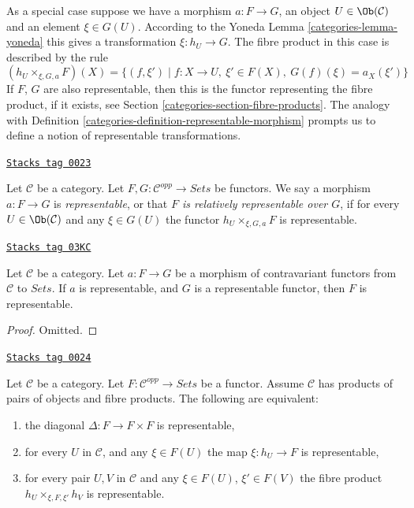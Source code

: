 As a special case suppose we have a morphism
$a : F \to G$, an object $U \in \Ob(\mathcal{C})$
and an element $\xi \in G(U)$. According to the Yoneda
Lemma \ref{categories-lemma-yoneda} this gives a transformation
$\xi : h_U \to G$. The fibre product in this case
is described by the rule
$$
(h_U \times_{\xi, G, a} F)(X) =
\{ (f, \xi') \mid f : X \to U, \ \xi' \in F(X), \ G(f)(\xi) = a_X(\xi')\}
$$
If $F$, $G$ are also representable, then this is the functor representing the
fibre product, if it exists, see Section \ref{categories-section-fibre-products}.
The analogy with Definition \ref{categories-definition-representable-morphism}
prompts us to define a notion
of representable transformations.

\begin{definition}
\label{categories-definition-representable-map-presheaves}
\href{https://stacks.math.columbia.edu/tag/0023}{\texttt{Stacks tag 0023}}

Let $\mathcal{C}$ be a category.
Let $F, G : \mathcal{C}^{opp} \to \textit{Sets}$
be functors. We say a morphism $a : F \to G$ is
{\it representable}, or that {\it $F$ is relatively representable
over $G$}, if for every $U \in \Ob(\mathcal{C})$
and any $\xi \in G(U)$ the functor
$h_U \times_{\xi, G, a} F$ is representable.
\end{definition}

\begin{lemma}
\label{categories-lemma-representable-over-representable}
\href{https://stacks.math.columbia.edu/tag/03KC}{\texttt{Stacks tag 03KC}}

Let $\mathcal{C}$ be a category.
Let $a : F \to G$ be a morphism of contravariant functors
from $\mathcal{C}$ to $\textit{Sets}$. If $a$ is representable,
and $G$ is a representable functor, then $F$ is representable.
\end{lemma}

\begin{proof}
Omitted.
\end{proof}

\begin{lemma}
\label{categories-lemma-representable-diagonal}
\href{https://stacks.math.columbia.edu/tag/0024}{\texttt{Stacks tag 0024}}

Let $\mathcal{C}$ be a category.
Let $F : \mathcal{C}^{opp} \to \textit{Sets}$ be a functor.
Assume $\mathcal{C}$ has products of pairs of objects and fibre products.
The following are equivalent:
\begin{enumerate}
\item the diagonal $\Delta : F \to F \times F$ is representable,
\item for every $U$ in $\mathcal{C}$,
and any $\xi \in F(U)$ the map $\xi : h_U \to F$ is representable,
\item for every pair $U, V$ in $\mathcal{C}$
and any $\xi \in F(U)$, $\xi' \in F(V)$ the fibre product
$h_U \times_{\xi, F, \xi'} h_V$ is representable.
\end{enumerate}
\end{lemma}

